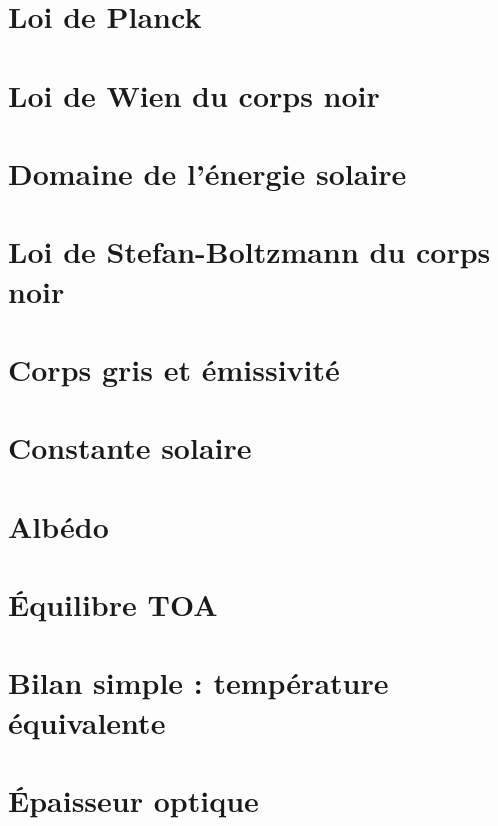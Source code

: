 \documentclass[a4paper,DIV16,10pt]{scrartcl}
\begin{document}
\newpage
\section{Loi de Planck}


\newpage
\section{Loi de Wien du corps noir}


\newpage
\section{Domaine de l'énergie solaire}


\newpage
\section{Loi de Stefan-Boltzmann du corps noir}

\section{Corps gris et émissivité}


\newpage
\section{Constante solaire}



\newpage 
\section{Albédo} 


\newpage
\section{\'Equilibre TOA}


\newpage
\section{Bilan simple : température équivalente}



\newpage
\section{\'Epaisseur optique}

\end{document}

